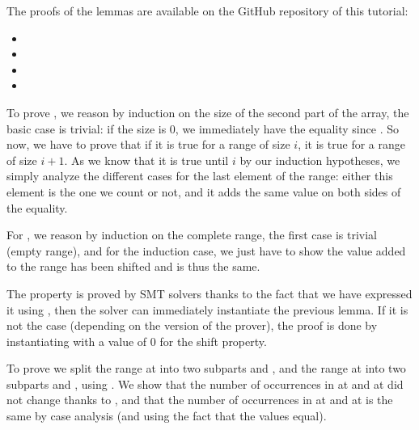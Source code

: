 \begin{Information}
  The proofs of the lemmas are available on the GitHub repository of this tutorial:
  \begin{itemize}
    \item {}
    \item {}
    \item {}
    \item {}
  \end{itemize}
\end{Information}


To prove , we reason by induction on the size
of the second part of the array, the basic case is trivial: if the size is 0, we
immediately have the equality since . So now, we have
to prove that if it is true for a range of size $i$, it is true for a range of
size $i+1$. As we know that it is true until $i$ by our induction hypotheses, we
simply analyze the different cases for the last element of the range: either this
element is the one we count or not, and it adds the same value on both sides of
the equality.


For , we reason by induction on the complete
range, the first case is trivial (empty range), and for the induction case, we
just have to show the value added to the range has been shifted and is thus the
same.


The property  is proved by SMT solvers
thanks to the fact that we have expressed it using , then the
solver can immediately instantiate the previous lemma. If it is not the case
(depending on the version of the prover), the proof is done by instantiating
 with a value of 0 for the shift property.


To prove  we split the range at
 into two subparts  and
, and the range at  into two subparts
 and , using
. We show that the number of occurrences in
 at  and  at
 did not change thanks to ,
and that the number of occurrences in  at
 and  at  is the same by
case analysis (and using the fact that the values equal).


